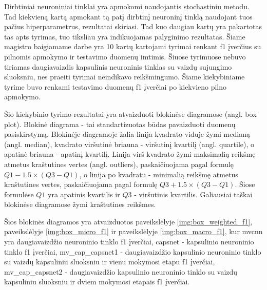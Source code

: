 Dirbtiniai neuroniniai tinklai yra apmokomi naudojantis stochastiniu metodu. Tad kiekvieną kartą apmokant tą patį dirbtinį neuroninį tinklą naudojant tuos pačius hiperparametrus, rezultatai skiriasi. Tad kuo daugiau kartų yra pakartotas tas apts tyrimas, tuo tiksliau yra indikuojamas palyginimo rezultatas. Šiame magistro baigiamame darbe yra 10 kartų kartojami tyrimai renkant f1 įverčius su pilnomis apmokymo ir testavimo duomenų imtimis. Šiuose tyrimuose nebuvo tiriamas daugiavaizdis kapsulinis neuroninis tinklas su vaizdų sujungimo sluoksniu, nes praeiti tyrimai neindikavo reikšmingumo. Šiame kiekybiniame tyrime buvo renkami testavimo duomenų f1 įverčiai po kiekvieno pilno apmokymo.


Šio kiekybinio tyrimo rezultatai yra atvaizduoti blokinėse diagramose (angl. box plot). Blokinė diagrama - tai standartizuotas būdas pavaizduoti duomenų pasiskirstymą. Blokinėje diagramoje žalia linija kvadrato viduje žymi medianą (angl. median), kvadrato viršutinė briauna - viršutinį kvartilį (angl. quartile), o apatinė briauna - apatinį kvartilį. Linija virš kvadrato žymi maksimalią reikšmę atmetus kraštutines vertes (angl. outliers), paskaičiuojama pagal formulę $Q1 - 1.5 \times (Q3 - Q1)$, o linija po kvadratu - minimalią reikšmę atmetus kraštutines vertes, paskaičiuojama pagal formulę $Q3 + 1.5 \times (Q3 - Q1)$. Šiose formulėse $Q1$ yra apatinis kvartilis ir $Q3$ - viršutinis kvartilis. Galiausiai taškai blokinėse diagramose žymi kraštutines reikšmes.

Šios blokinės diagramos yra atvaizduotos paveikslėlyje \ref{img:box_weighted_f1}, paveikslėlyje \ref{img:box_micro_f1} ir  paveikslėlyje \ref{img:box_macro_f1}, kur
mvcnn yra daugiavaizdžio neuroninio tinklo f1 įverčiai, capsnet - kapsulinio neuroninio tinklo f1 įverčiai, mv\_cap\_capsnet1 - daugiavaizdžio kapsulinio neuroninio tinklo su vaizdų kapsuliniu sluoksniu ir vienu mokymosi etapu f1 įverčiai, mv\_cap\_capsnet2 - daugiavaizdžio kapsulinio neuroninio tinklo su vaizdų kapsuliniu sluoksniu ir dviem mokymosi etapais f1 įverčiai.

